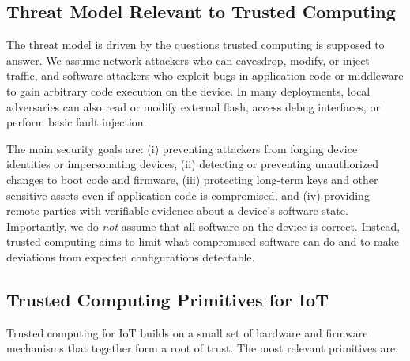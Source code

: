 \documentclass[conference,11pt,a4paper]{IEEEtran}
\begin{document}
\subsection{Threat Model Relevant to Trusted Computing}
The threat model is driven by the questions trusted computing is supposed to answer. We assume network attackers who can eavesdrop, modify, or inject traffic, and software attackers who exploit bugs in application code or middleware to gain arbitrary code execution on the device. In many deployments, local adversaries can also read or modify external flash, access debug interfaces, or perform basic fault injection.

The main security goals are: (i) preventing attackers from forging device identities or impersonating devices, (ii) detecting or preventing unauthorized changes to boot code and firmware, (iii) protecting long-term keys and other sensitive assets even if application code is compromised, and (iv) providing remote parties with verifiable evidence about a device's software state. Importantly, we do \emph{not} assume that all software on the device is correct. Instead, trusted computing aims to limit what compromised software can do and to make deviations from expected configurations detectable.

\subsection{Trusted Computing Primitives for IoT}
Trusted computing for IoT builds on a small set of hardware and firmware mechanisms that together form a root of trust. The most relevant primitives are:
\end{document}
